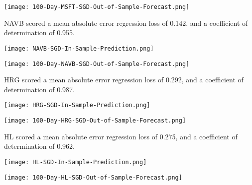 \begin{center}  
    \texttt{[image: 100-Day-MSFT-SGD-Out-of-Sample-Forecast.png]}
    \label{fig:nonfloat}
\end{center}

NAVB scored a mean absolute error regression loss of 0.142, and a coefficient of determination of 0.955.

\begin{center}
    \texttt{[image: NAVB-SGD-In-Sample-Prediction.png]}
    \label{fig:nonfloat}
\end{center}

\begin{center}  
    \texttt{[image: 100-Day-NAVB-SGD-Out-of-Sample-Forecast.png]}
    \label{fig:nonfloat}
\end{center}

HRG scored a mean absolute error regression loss of 0.292, and a coefficient of determination of 0.987.

\begin{center}
    \texttt{[image: HRG-SGD-In-Sample-Prediction.png]}
    \label{fig:nonfloat}
\end{center}

\begin{center}  
    \texttt{[image: 100-Day-HRG-SGD-Out-of-Sample-Forecast.png]}
    \label{fig:nonfloat}
\end{center}

HL scored a mean absolute error regression loss of 0.275, and a coefficient of determination of 0.962.

\begin{center}
    \texttt{[image: HL-SGD-In-Sample-Prediction.png]}
    \label{fig:nonfloat}
\end{center}

\begin{center}  
    \texttt{[image: 100-Day-HL-SGD-Out-of-Sample-Forecast.png]}
    \label{fig:nonfloat}
\end{center}

